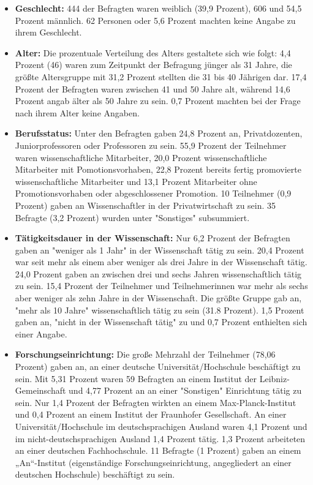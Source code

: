 \begin{itemize}
\item \textbf{Geschlecht:} 444 der Befragten waren weiblich (39,9 Prozent), 606 und 54,5 Prozent männlich. 62 Personen oder 5,6 Prozent machten keine Angabe zu ihrem Geschlecht.
\item \textbf{Alter:} Die prozentuale Verteilung des Alters gestaltete sich wie folgt: 4,4 Prozent (46) waren zum Zeitpunkt der Befragung jünger als 31 Jahre, die größte Altersgruppe mit 31,2 Prozent stellten die 31 bis 40 Jährigen dar. 17,4 Prozent der Befragten waren zwischen 41 und 50 Jahre alt, während 14,6 Prozent angab älter als 50 Jahre zu sein. 0,7 Prozent machten bei der Frage nach ihrem Alter keine Angaben.
\item \textbf{Berufsstatus:} Unter den Befragten gaben 24,8 Prozent an, Privatdozenten, Juniorprofessoren oder Professoren zu sein. 55,9 Prozent der Teilnehmer waren wissenschaftliche Mitarbeiter, 20,0 Prozent wissenschaftliche Mitarbeiter mit Pomotionsvorhaben, 22,8 Prozent bereits fertig promovierte wissenschaftliche Mitarbeiter und 13,1 Prozent Mitarbeiter ohne Promotionsvorhaben oder abgeschlossener Promotion. 10 Teilnehmer (0,9 Prozent) gaben an Wissenschaftler in der Privatwirtschaft zu sein. 35 Befragte (3,2 Prozent) wurden unter "Sonstiges" subsummiert.
\item \textbf{Tätigkeitsdauer in der Wissenschaft:} Nur 6,2 Prozent der Befragten gaben an "weniger als 1 Jahr" in der Wissenschaft tätig zu sein. 20,4 Prozent war seit mehr als einem aber weniger als drei Jahre in der Wissenschaft tätig. 24,0 Prozent gaben an zwischen drei und sechs Jahren wissenschaftlich tätig zu sein. 15,4 Prozent der Teilnehmer und Teilnehmerinnen war mehr als sechs aber weniger als zehn Jahre in der Wissenschaft. Die größte Gruppe gab an, "mehr als 10 Jahre" wissenschaftlich tätig zu sein (31.8 Prozent). 1,5 Prozent gaben an, "nicht in der Wissenschaft tätig" zu und 0,7 Prozent enthielten sich einer Angabe.
\item \textbf{Forschungseinrichtung:} Die große Mehrzahl der Teilnehmer (78,06 Prozent) gaben an, an einer deutsche Universität/Hochschule beschäftigt zu sein. Mit 5,31 Prozent waren 59 Befragten an einem Institut der Leibniz-Gemeinschaft und 4,77 Prozent an an einer "Sonstigen" Einrichtung tätig zu sein. Nur 1,4 Prozent der Befragten wirkten an einem Max-Planck-Institut und 0,4 Prozent an einem Institut der Fraunhofer Gesellschaft. An einer Universität/Hochschule im deutschsprachigen Ausland waren 4,1 Prozent und im nicht-deutschsprachigen Ausland 1,4 Prozent tätig. 1,3 Prozent arbeiteten an einer deutschen Fachhochschule. 11 Befragte (1 Prozent) gaben an einem „An“-Institut (eigenständige Forschungseinrichtung, angegliedert an einer deutschen Hochschule) beschäftigt zu sein.
\end{itemize}

